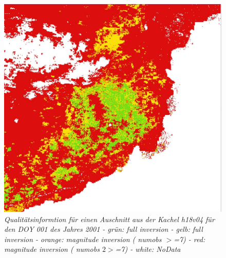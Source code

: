 \documentclass[11pt]{report}
\begin{document}
\begin{figure}[H]
\begin{minipage}[b]{.4\linewidth}
      \includegraphics[scale=0.3]{./Grafiken/Fitting/Fitting_durchführung/Fitting_Vergleich_Rohdaten_Qualität_1.JPG}
\caption{\textit{Qualitätsinformtion für einen Auschnitt aus der Kachel h18v04 für den DOY 001 des Jahres 2001 - grün: full inversion - gelb: full inversion - orange: magnitude inversion ( numobs $>$=7)  - red: magnitude inversion ( numobs $2>$=7) - white: NoData}}
   \end{minipage}
\end{figure}
\end{document}
